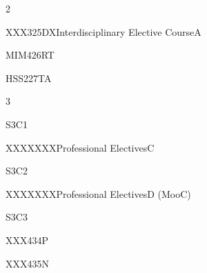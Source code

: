 \documentclass[a4paper]{syllabus}
\begin{document}
\begin{semester}{2}
\begin{electivegroup}{XXX325DX}{Interdisciplinary Elective Course}{A}
	\end{electivegroup}


		\begin{definecourse}{MIM426RT}
		\end{definecourse}
		\begin{definecourse}{HSS227TA}
		\end{definecourse}
	\end{semester}

	\begin{semester}{3}
		\begin{definecourse}{S3C1}
		\end{definecourse}

		\begin{electivegroup}{XXXXXXX}{Professional Electives}{C}
		\begin{definecourse}{S3C2}
		\end{definecourse}
		
		
		
		\end{electivegroup}
		
		
		\begin{electivegroup}{XXXXXXX}{Professional Electives}{D (MooC)}
		\begin{definecourse}{S3C3}
		\end{definecourse}
		
		
		
		\end{electivegroup}
	
	
		\begin{definecourse}{XXX434P}
		\end{definecourse}
		\begin{definecourse}{XXX435N}
		\end{definecourse}
		
	\end{semester}
	
\end{document}
